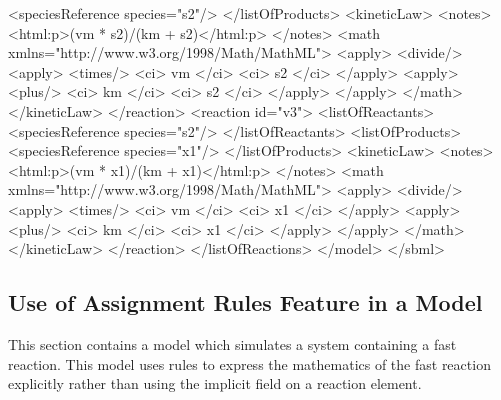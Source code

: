 \documentclass[10pt,twocolumntoc]{cekarticle}
\begin{document}
\begin{example}
                    <speciesReference species="s2"/>
                </listOfProducts>
                <kineticLaw>
                    <notes>
                        <html:p>(vm * s2)/(km + s2)</html:p>
                    </notes>
                    <math xmlns="http://www.w3.org/1998/Math/MathML">
                        <apply>
                            <divide/>
                            <apply>
                                <times/>
                                <ci> vm </ci>
                                <ci> s2 </ci>
                            </apply>
                            <apply>
                                <plus/>
                                <ci> km </ci>
                                <ci> s2 </ci>
                            </apply>
                        </apply>
                    </math>
                </kineticLaw>
            </reaction>
            <reaction id="v3">
                <listOfReactants>
                    <speciesReference species="s2"/>
                </listOfReactants>
                <listOfProducts>
                    <speciesReference species="x1"/>
                </listOfProducts>
                <kineticLaw>
                    <notes>
                        <html:p>(vm * x1)/(km + x1)</html:p>
                    </notes>
                    <math xmlns="http://www.w3.org/1998/Math/MathML">
                        <apply>
                            <divide/>
                            <apply>
                                <times/>
                                <ci> vm </ci>
                                <ci> x1 </ci>
                            </apply>
                            <apply>
                                <plus/>
                                <ci> km </ci>
                                <ci> x1 </ci>
                            </apply>
                        </apply>
                    </math>
                </kineticLaw>
            </reaction>
        </listOfReactions>
    </model>
</sbml>
\end{example}

\subsection{Use of Assignment Rules Feature in a Model}
\label{apdx:rules-eg}
This section contains a model which simulates a system containing
a fast reaction. This model uses rules to express the mathematics
of the fast reaction explicitly rather than using the implicit
 field on a reaction element.
\end{document}
